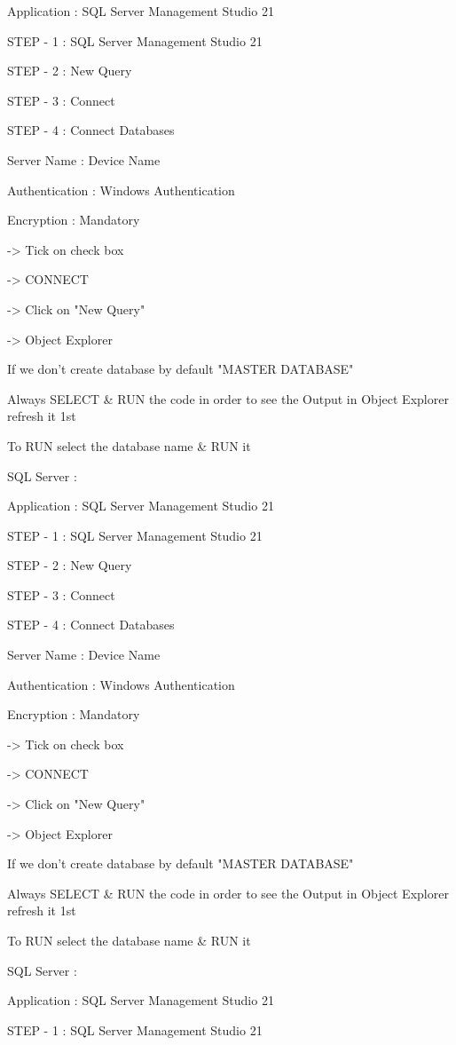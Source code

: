 Application : SQL Server Management Studio 21

STEP - 1 : SQL Server Management Studio 21

STEP - 2 : New Query

STEP - 3 : Connect

STEP - 4 : Connect Databases


Server Name : Device Name

Authentication : Windows Authentication

Encryption : Mandatory

-> Tick on check box

-> CONNECT

-> Click on "New Query"

-> Object Explorer


If we don't create database by default "MASTER DATABASE"


Always SELECT & RUN the code in order to see the Output in Object Explorer refresh it 1st


To RUN select the database name & RUN it

SQL Server :

Application : SQL Server Management Studio 21

STEP - 1 : SQL Server Management Studio 21

STEP - 2 : New Query

STEP - 3 : Connect

STEP - 4 : Connect Databases


Server Name : Device Name

Authentication : Windows Authentication

Encryption : Mandatory

-> Tick on check box

-> CONNECT

-> Click on "New Query"

-> Object Explorer


If we don't create database by default "MASTER DATABASE"


Always SELECT & RUN the code in order to see the Output in Object Explorer refresh it 1st


To RUN select the database name & RUN it

SQL Server :

Application : SQL Server Management Studio 21

STEP - 1 : SQL Server Management Studio 21

